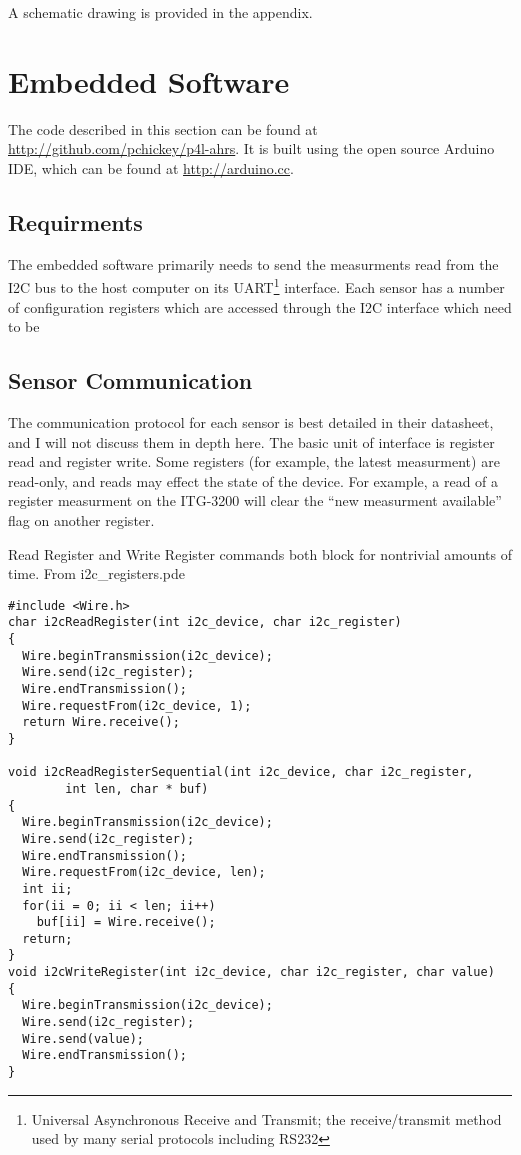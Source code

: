 \documentclass[12pt]{report}
\begin{document}

A schematic drawing is provided in the appendix. %

\lstset{language=C++,basicstyle=\ttfamily}
\section{Embedded Software}
The code described in this section can be found at \url{http://github.com/pchickey/p4l-ahrs}. It is built using the open source Arduino IDE, which can be found at \url{http://arduino.cc}.

\subsection{Requirments}
The embedded software primarily needs to send the measurments read from the I2C bus to the host computer on its 
UART\footnote{Universal Asynchronous Receive and Transmit; the receive/transmit method used by many serial protocols including RS232} 
interface. Each sensor has a number of configuration registers which are accessed through the I2C interface which need to be 

\subsection{Sensor Communication}

The communication protocol for each sensor is best detailed in their datasheet, and I will not discuss them in depth here. The basic unit of interface is register read and register write. Some registers (for example, the latest measurment) are read-only, and reads may effect the state of the device. For example, a read of a register measurment on the ITG-3200 will clear the ``new measurment available'' flag on another register.   

Read Register and Write Register commands both block for nontrivial amounts of time.
\lstset{language=C++,basicstyle=\ttfamily}
From i2c_registers.pde
\begin{lstlisting}
#include <Wire.h>
char i2cReadRegister(int i2c_device, char i2c_register)
{
  Wire.beginTransmission(i2c_device);
  Wire.send(i2c_register);
  Wire.endTransmission();
  Wire.requestFrom(i2c_device, 1);
  return Wire.receive();  
}

void i2cReadRegisterSequential(int i2c_device, char i2c_register, 
        int len, char * buf)
{
  Wire.beginTransmission(i2c_device);
  Wire.send(i2c_register);
  Wire.endTransmission();
  Wire.requestFrom(i2c_device, len);
  int ii;
  for(ii = 0; ii < len; ii++)
    buf[ii] = Wire.receive();
  return;
}
void i2cWriteRegister(int i2c_device, char i2c_register, char value)
{
  Wire.beginTransmission(i2c_device);
  Wire.send(i2c_register);
  Wire.send(value);
  Wire.endTransmission();
}  
\end{lstlisting}
\end{document}
